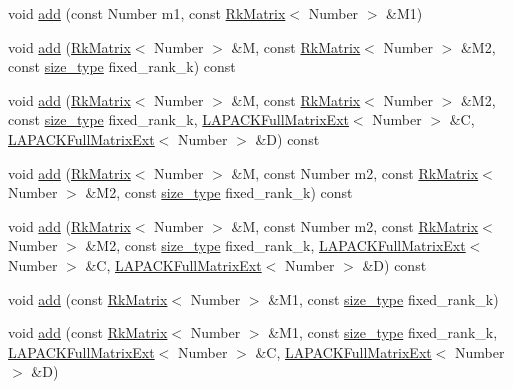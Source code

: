 \begin{DoxyCompactItemize}
\item 
void \hyperlink{classRkMatrix_a93b434797b9142a4dce0c6a64ba1e89c}{add} (const Number m1, const \hyperlink{classRkMatrix}{Rk\+Matrix}$<$ Number $>$ \&M1)
\item 
void \hyperlink{classRkMatrix_ad8668d42978011b3e65d0381bfb068d5}{add} (\hyperlink{classRkMatrix}{Rk\+Matrix}$<$ Number $>$ \&M, const \hyperlink{classRkMatrix}{Rk\+Matrix}$<$ Number $>$ \&M2, const \hyperlink{classRkMatrix_add060bfc3a4cc77f858c3d6dd58cadd5}{size\+\_\+type} fixed\+\_\+rank\+\_\+k) const
\item 
void \hyperlink{classRkMatrix_a9b4893d3fb6e407fa2fb077704260c28}{add} (\hyperlink{classRkMatrix}{Rk\+Matrix}$<$ Number $>$ \&M, const \hyperlink{classRkMatrix}{Rk\+Matrix}$<$ Number $>$ \&M2, const \hyperlink{classRkMatrix_add060bfc3a4cc77f858c3d6dd58cadd5}{size\+\_\+type} fixed\+\_\+rank\+\_\+k, \hyperlink{classLAPACKFullMatrixExt}{L\+A\+P\+A\+C\+K\+Full\+Matrix\+Ext}$<$ Number $>$ \&C, \hyperlink{classLAPACKFullMatrixExt}{L\+A\+P\+A\+C\+K\+Full\+Matrix\+Ext}$<$ Number $>$ \&D) const
\item 
void \hyperlink{classRkMatrix_aeba05e73aa670b1029c1720e56d10e81}{add} (\hyperlink{classRkMatrix}{Rk\+Matrix}$<$ Number $>$ \&M, const Number m2, const \hyperlink{classRkMatrix}{Rk\+Matrix}$<$ Number $>$ \&M2, const \hyperlink{classRkMatrix_add060bfc3a4cc77f858c3d6dd58cadd5}{size\+\_\+type} fixed\+\_\+rank\+\_\+k) const
\item 
void \hyperlink{classRkMatrix_a493fe96e729d6628f1ee46b7557f2d97}{add} (\hyperlink{classRkMatrix}{Rk\+Matrix}$<$ Number $>$ \&M, const Number m2, const \hyperlink{classRkMatrix}{Rk\+Matrix}$<$ Number $>$ \&M2, const \hyperlink{classRkMatrix_add060bfc3a4cc77f858c3d6dd58cadd5}{size\+\_\+type} fixed\+\_\+rank\+\_\+k, \hyperlink{classLAPACKFullMatrixExt}{L\+A\+P\+A\+C\+K\+Full\+Matrix\+Ext}$<$ Number $>$ \&C, \hyperlink{classLAPACKFullMatrixExt}{L\+A\+P\+A\+C\+K\+Full\+Matrix\+Ext}$<$ Number $>$ \&D) const
\item 
void \hyperlink{classRkMatrix_a1f51eac54ddb43c0670a72da62bc1e55}{add} (const \hyperlink{classRkMatrix}{Rk\+Matrix}$<$ Number $>$ \&M1, const \hyperlink{classRkMatrix_add060bfc3a4cc77f858c3d6dd58cadd5}{size\+\_\+type} fixed\+\_\+rank\+\_\+k)
\item 
void \hyperlink{classRkMatrix_a344f63dbe69f2858ed39a8731cc3beba}{add} (const \hyperlink{classRkMatrix}{Rk\+Matrix}$<$ Number $>$ \&M1, const \hyperlink{classRkMatrix_add060bfc3a4cc77f858c3d6dd58cadd5}{size\+\_\+type} fixed\+\_\+rank\+\_\+k, \hyperlink{classLAPACKFullMatrixExt}{L\+A\+P\+A\+C\+K\+Full\+Matrix\+Ext}$<$ Number $>$ \&C, \hyperlink{classLAPACKFullMatrixExt}{L\+A\+P\+A\+C\+K\+Full\+Matrix\+Ext}$<$ Number $>$ \&D)

\end{DoxyCompactItemize}
